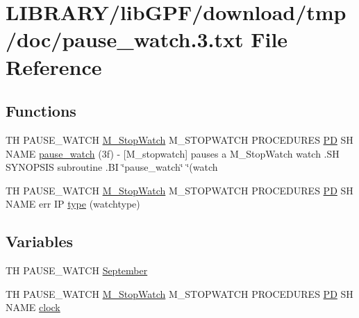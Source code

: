 \hypertarget{pause__watch_83_8txt}{}\section{L\+I\+B\+R\+A\+R\+Y/lib\+G\+P\+F/download/tmp/doc/pause\+\_\+watch.3.txt File Reference}
\label{pause__watch_83_8txt}
\subsection*{Functions}
\begin{DoxyCompactItemize}
\item 
TH P\+A\+U\+S\+E\+\_\+\+W\+A\+T\+CH \hyperlink{option__stopwatch_83_8txt_aa2011fc45a5e502e87ee50996a8a9305}{M\+\_\+\+Stop\+Watch} M\+\_\+\+S\+T\+O\+P\+W\+A\+T\+CH P\+R\+O\+C\+E\+D\+U\+R\+ES \hyperlink{what__overview_81_8txt_a85f26da5a4481fbdb0d9c79f2b94de3e}{PD} SH N\+A\+ME \hyperlink{pause__watch_83_8txt_a1f08bdb77c0b77a9e57928cd240ce9ea}{pause\+\_\+watch} (3f) -\/ \mbox{[}\+M\+\_\+stopwatch\mbox{]} pauses a M\+\_\+\+Stop\+Watch watch .\+S\+H S\+Y\+N\+O\+P\+S\+I\+S subroutine .\+B\+I \char`\"{}pause\+\_\+watch\char`\"{} \char`\"{}(watch
\item 
TH P\+A\+U\+S\+E\+\_\+\+W\+A\+T\+CH \hyperlink{option__stopwatch_83_8txt_aa2011fc45a5e502e87ee50996a8a9305}{M\+\_\+\+Stop\+Watch} M\+\_\+\+S\+T\+O\+P\+W\+A\+T\+CH P\+R\+O\+C\+E\+D\+U\+R\+ES \hyperlink{what__overview_81_8txt_a85f26da5a4481fbdb0d9c79f2b94de3e}{PD} SH N\+A\+ME err IP \hyperlink{pause__watch_83_8txt_a6d82b64df023fe3efbb7b896bcb179fa}{type} (watchtype)
\end{DoxyCompactItemize}
\subsection*{Variables}
\begin{DoxyCompactItemize}
\item 
TH P\+A\+U\+S\+E\+\_\+\+W\+A\+T\+CH \hyperlink{pause__watch_83_8txt_a9c7b5c1b7a2e7848e0da5b3d021ecba9}{September}
\item 
TH P\+A\+U\+S\+E\+\_\+\+W\+A\+T\+CH \hyperlink{option__stopwatch_83_8txt_aa2011fc45a5e502e87ee50996a8a9305}{M\+\_\+\+Stop\+Watch} M\+\_\+\+S\+T\+O\+P\+W\+A\+T\+CH P\+R\+O\+C\+E\+D\+U\+R\+ES \hyperlink{what__overview_81_8txt_a85f26da5a4481fbdb0d9c79f2b94de3e}{PD} SH N\+A\+ME \hyperlink{pause__watch_83_8txt_ae2a6300fc3b4629186796cf6d0c93440}{clock}
\end{DoxyCompactItemize}


